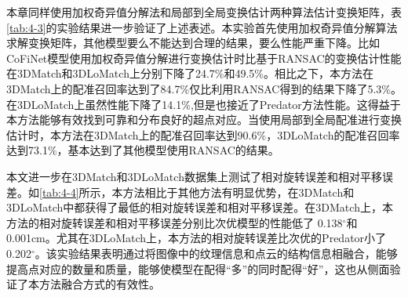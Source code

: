     本章同样使用加权奇异值分解法和局部到全局变换估计两种算法估计变换矩阵，表\ref{tab:4-3}的实验结果进一步验证了上述表述。本实验首先使用加权奇异值分解算法求解变换矩阵，其他模型要么不能达到合理的结果，要么性能严重下降。比如CoFiNet模型使用加权奇异值分解进行变换估计时比基于RANSAC的变换估计性能在3DMatch和3DLoMatch上分别下降了24.7\%和49.5\%。相比之下，本方法在3DMatch上的配准召回率达到了84.7\%仅比利用RANSAC得到的结果下降了5.3\%。在3DLoMatch上虽然性能下降了14.1\%,但是也接近了Predator方法性能。这得益于本方法能够有效找到可靠和分布良好的超点对应。当使用局部到全局配准进行变换估计时，本方法在3DMatch上的配准召回率达到90.6\%，3DLoMatch的配准召回率达到73.1\%，基本达到了其他模型使用RANSAC的结果。\par
    
    
    本文进一步在3DMatch和3DLoMatch数据集上测试了相对旋转误差和相对平移误差。如\ref{tab:4-4}所示，本方法相比于其他方法有明显优势，在3DMatch和3DLoMatch中都获得了最低的相对旋转误差和相对平移误差。在3DMatch上，本方法的相对旋转误差和相对平移误差分别比次优模型的性能低了
    0.138$^\circ$和0.001cm。尤其在3DLoMatch上，本方法的相对旋转误差比次优的Predator小了0.202$^\circ$。该实验结果表明通过将图像中的纹理信息和点云的结构信息相融合，能够提高点对应的数量和质量，能够使模型在配得“多”的同时配得“好”，这也从侧面验证了本方法融合方式的有效性。
    

